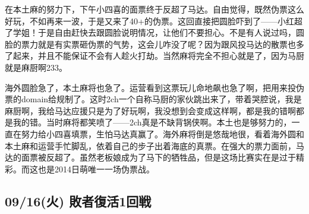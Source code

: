 在本土麻的努力下，下午小四喜的面票终于反超了马达。自由觉得，既然伪票这么好玩，不如再来一波，于是又来了40+的伪票。这回直接把圆脸吓到了——小红超了学姐！于是自由赶快去跟圆脸说明情况，让他们不要担心。不是有人说过吗，圆脸的票力就是有实票砸伪票的气势，这会儿咋没了呢？因为跟风投马达的散票也多了起来，并且不能保证不会有人趁火打劫。当然麻将完全不担心就是了，因为马厨就是麻厨啊233。

海外圆脸急了，本土麻将也急了。运营看到这票玩儿命地飙也急了啊，把用来投伪票的domain给规制了。这时2ch一个自称马厨的家伙跳出来了，带着哭腔说，我是麻厨啊，我给马达应援只是为了好玩啊，我没想到会变成这样啊，都是我的错啊都是我的错。当时麻将都笑喷了——2ch真是不缺背锅侠啊。本土也是够努力的，一直在努力给小四喜填票，生怕马达真赢了。海外麻将倒是悠哉地很，看着海外圆和本土麻和运营手忙脚乱，依着自己的步子出着海底的真票。在强大的票力面前，马达的面票被反超了。虽然老板娘成为了马下的牺牲品，但是这场比赛实在是过于精彩。而这也是2014日萌唯一一场伪票战。

\subsection{09/16(火) 敗者復活1回戦}

